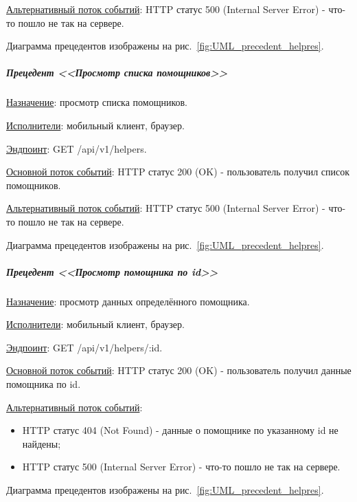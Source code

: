 \underline{Альтернативный поток событий}:
HTTP статус 500 (Internal Server Error) - что-то пошло не так на сервере.

Диаграмма прецедентов изображены на рис.~\ref{fig:UML_precedent_helpres}.


\subparagraph{Прецедент <<Просмотр списка помощников>>} \hspace{0pt}

\underline{Назначение}: просмотр списка помощников.

\underline{Исполнители}: мобильный клиент, браузер.

\underline{Эндпоинт}: GET /api/v1/helpers.


\underline{Основной поток событий}: HTTP статус 200 (OK) - пользователь получил список помощников. 

\underline{Альтернативный поток событий}:
HTTP статус 500 (Internal Server Error) - что-то пошло не так на сервере.

Диаграмма прецедентов изображены на рис.~\ref{fig:UML_precedent_helpres}.


\subparagraph{Прецедент <<Просмотр помощника по id>>} \hspace{0pt}

\underline{Назначение}: просмотр данных определённого помощника.

\underline{Исполнители}: мобильный клиент, браузер.

\underline{Эндпоинт}: GET /api/v1/helpers/:id.


\underline{Основной поток событий}: HTTP статус 200 (OK) - пользователь получил данные помощника по id. 

\underline{Альтернативный поток событий}:

\begin{itemize}
    \item HTTP статус 404 (Not Found) - данные о помощнике по указанному id не найдены;
    \item HTTP статус 500 (Internal Server Error) - что-то пошло не так на сервере.
\end{itemize}

Диаграмма прецедентов изображены на рис.~\ref{fig:UML_precedent_helpres}.



